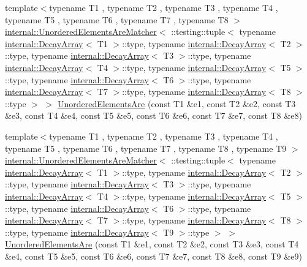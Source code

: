 \begin{DoxyCompactItemize}
{\footnotesize template$<$typename T1 , typename T2 , typename T3 , typename T4 , typename T5 , typename T6 , typename T7 , typename T8 $>$ }\\\hyperlink{classtesting_1_1internal_1_1_unordered_elements_are_matcher}{internal\+::\+Unordered\+Elements\+Are\+Matcher}$<$ \+::testing\+::tuple$<$ typename \hyperlink{structtesting_1_1internal_1_1_decay_array}{internal\+::\+Decay\+Array}$<$ T1 $>$\+::type, typename \hyperlink{structtesting_1_1internal_1_1_decay_array}{internal\+::\+Decay\+Array}$<$ T2 $>$\+::type, typename \hyperlink{structtesting_1_1internal_1_1_decay_array}{internal\+::\+Decay\+Array}$<$ T3 $>$\+::type, typename \hyperlink{structtesting_1_1internal_1_1_decay_array}{internal\+::\+Decay\+Array}$<$ T4 $>$\+::type, typename \hyperlink{structtesting_1_1internal_1_1_decay_array}{internal\+::\+Decay\+Array}$<$ T5 $>$\+::type, typename \hyperlink{structtesting_1_1internal_1_1_decay_array}{internal\+::\+Decay\+Array}$<$ T6 $>$\+::type, typename \hyperlink{structtesting_1_1internal_1_1_decay_array}{internal\+::\+Decay\+Array}$<$ T7 $>$\+::type, typename \hyperlink{structtesting_1_1internal_1_1_decay_array}{internal\+::\+Decay\+Array}$<$ T8 $>$\+::type $>$ $>$ \hyperlink{namespacetesting_a0f30358234947d21c7f39f15a8395d04}{Unordered\+Elements\+Are} (const T1 \&e1, const T2 \&e2, const T3 \&e3, const T4 \&e4, const T5 \&e5, const T6 \&e6, const T7 \&e7, const T8 \&e8)
\item 
{\footnotesize template$<$typename T1 , typename T2 , typename T3 , typename T4 , typename T5 , typename T6 , typename T7 , typename T8 , typename T9 $>$ }\\\hyperlink{classtesting_1_1internal_1_1_unordered_elements_are_matcher}{internal\+::\+Unordered\+Elements\+Are\+Matcher}$<$ \+::testing\+::tuple$<$ typename \hyperlink{structtesting_1_1internal_1_1_decay_array}{internal\+::\+Decay\+Array}$<$ T1 $>$\+::type, typename \hyperlink{structtesting_1_1internal_1_1_decay_array}{internal\+::\+Decay\+Array}$<$ T2 $>$\+::type, typename \hyperlink{structtesting_1_1internal_1_1_decay_array}{internal\+::\+Decay\+Array}$<$ T3 $>$\+::type, typename \hyperlink{structtesting_1_1internal_1_1_decay_array}{internal\+::\+Decay\+Array}$<$ T4 $>$\+::type, typename \hyperlink{structtesting_1_1internal_1_1_decay_array}{internal\+::\+Decay\+Array}$<$ T5 $>$\+::type, typename \hyperlink{structtesting_1_1internal_1_1_decay_array}{internal\+::\+Decay\+Array}$<$ T6 $>$\+::type, typename \hyperlink{structtesting_1_1internal_1_1_decay_array}{internal\+::\+Decay\+Array}$<$ T7 $>$\+::type, typename \hyperlink{structtesting_1_1internal_1_1_decay_array}{internal\+::\+Decay\+Array}$<$ T8 $>$\+::type, typename \hyperlink{structtesting_1_1internal_1_1_decay_array}{internal\+::\+Decay\+Array}$<$ T9 $>$\+::type $>$ $>$ \hyperlink{namespacetesting_a2e03e363e193ef512bf9fa964c484375}{Unordered\+Elements\+Are} (const T1 \&e1, const T2 \&e2, const T3 \&e3, const T4 \&e4, const T5 \&e5, const T6 \&e6, const T7 \&e7, const T8 \&e8, const T9 \&e9)

\end{DoxyCompactItemize}
